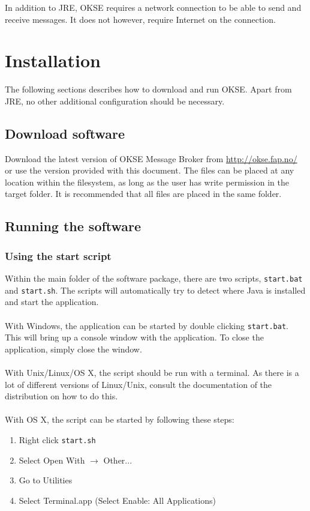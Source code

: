 In addition to JRE, OKSE requires a network connection to be able to send and receive messages. It does not however, require Internet on the connection. 

\section{Installation}
\label{Installation_okse}

The following sections describes how to download and run OKSE. Apart from JRE, no other additional configuration should be necessary.

\subsection{Download software}

Download the latest version of OKSE Message Broker from \url{http://okse.fap.no/} or use the version provided with this document. The files can be placed at any location within the filesystem, as long as the user has write permission in the target folder. It is recommended that all files are placed in the same folder.

\subsection{Running the software}

\subsubsection{Using the start script}
Within the main folder of the software package, there are two scripts, \verb!start.bat! and \verb!start.sh!. The scripts will automatically try to detect where Java is installed and start the application.\\\\With Windows, the application can be started by double clicking \verb!start.bat!. This will bring up a console window with the application. To close the application, simply close the window.\\\\With Unix/Linux/OS X, the script should be run with a terminal. As there is a lot of different versions of Linux/Unix, consult the documentation of the distribution on how to do this.\\\\With OS X, the script can be started by following these steps:

\begin{enumerate}
\item Right click \verb!start.sh!
\item Select Open With $\rightarrow$ Other...
\item Go to Utilities
\item Select Terminal.app (Select Enable: All Applications)
\end{enumerate}

